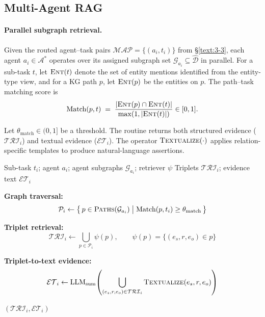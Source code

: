 \documentclass[sigconf]{acmart}
\begin{document}



\subsection{Multi-Agent RAG}
\label{text:3-4}

\paragraph{Parallel subgraph retrieval.}
Given the routed agent--task pairs \(\mathcal{MAP}=\{(a_i, t_i)\}\) from \S\ref{text:3-3},
each agent \(a_i \in \mathcal{A}^*\) operates over its assigned subgraph set
\(\mathcal{G}_{a_i}\subseteq \hat{\mathcal{D}}\) in parallel.
For a sub-task \(t\), let \(\textsc{Ent}(t)\) denote the set of entity mentions
identified from the entity-type view, and for a KG path \(p\), let \(\textsc{Ent}(p)\) be the
entities on \(p\). The path–task matching score is
\begin{equation}
\label{eq:match}
\text{Match}(p,t) \;=\; \frac{\lvert \textsc{Ent}(p)\cap \textsc{Ent}(t)\rvert}{\max(1,\lvert \textsc{Ent}(t)\rvert)} \in [0,1].
\end{equation}

Let \(\theta_{\text{match}}\in(0,1]\) be a threshold. The routine returns both structured evidence (\(\mathcal{TRI}_i\)) and textual evidence (\(\mathcal{ET}_i\)). The operator \(\textsc{Textualize}(\cdot)\) applies relation-specific templates to produce natural-language assertions.

\begin{algorithm}[H]
\caption{Parallel Subgraph Retrieval (per agent \(a_i\))}
\label{app:alg_marag}
\begin{algorithmic}[1]
\Require Sub-task \(t_i\); agent \(a_i\); agent subgraphs \(\mathcal{G}_{a_i}\); retriever \(\psi\)
\Ensure Triplets \(\mathcal{TRI}_i\); evidence text \(\mathcal{ET}_i\)

\State \textbf{Graph traversal:}
\[
\mathcal{P}_i \leftarrow \bigl\{\, p \in \textsc{Paths}(\mathcal{G}_{a_i}) \; \big| \; \text{Match}(p,t_i)\ge \theta_{\text{match}} \,\bigr\}
\]

\State \textbf{Triplet retrieval:}
\[
\mathcal{TRI}_i \leftarrow \bigcup_{p \in \mathcal{P}_i} \psi(p), 
\qquad \psi(p)=\{(e_s,r,e_o)\in p\}
\]

\State \textbf{Triplet-to-text evidence:}
\[
\mathcal{ET}_i \leftarrow \text{LLM}_{\text{sum}}\!\left(\bigcup_{(e_s,r,e_o)\in \mathcal{TRI}_i} \textsc{Textualize}(e_s,r,e_o)\right)
\]

\State \Return \((\mathcal{TRI}_i, \mathcal{ET}_i)\)
\end{algorithmic}
\end{algorithm}
\end{document}
